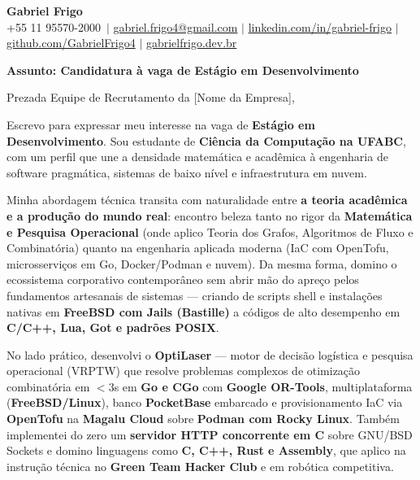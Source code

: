 \documentclass[letterpaper,10pt]{article}
\makeatletter
\newcommand{\candidateName}{Gabriel Frigo}
\newcommand{\candidatePhone}{+55 11 95570-2000}
\newcommand{\candidateEmail}{gabriel.frigo4@gmail.com}
\newcommand{\candidateLinkedInUser}{gabriel-frigo}
\newcommand{\candidateLinkedInURL}{https://linkedin.com/in/gabriel-frigo-b6727b275/}
\newcommand{\candidateGitHubUser}{GabrielFrigo4}
\newcommand{\candidateGitHubURL}{https://github.com/GabrielFrigo4}
\newcommand{\candidateWebsite}{gabrielfrigo.dev.br}
\newcommand{\candidateWebsiteURL}{https://gabrielfrigo.dev.br}
\newcommand{\targetRole}{Estágio em Desenvolvimento}
\newcommand{\targetCompany}{[Nome da Empresa]}
\makeatother
\begin{document}
\begin{center}
  \textbf{\Huge \candidateName} \\ \vspace{4pt}
  \small \candidatePhone\ $|$ \href{mailto:\candidateEmail}{\candidateEmail} $|$
  \href{\candidateLinkedInURL}{linkedin.com/in/\candidateLinkedInUser} $|$
  \href{\candidateGitHubURL}{github.com/\candidateGitHubUser} $|$
  \href{\candidateWebsiteURL}{\candidateWebsite}
\end{center}

\vspace{6pt}

\textbf{Assunto: Candidatura à vaga de \targetRole}

Prezada Equipe de Recrutamento da \targetCompany,

Escrevo para expressar meu interesse na vaga de \textbf{\targetRole}. Sou estudante de \textbf{Ciência da Computação na UFABC}, com um perfil que une a densidade matemática e acadêmica à engenharia de software pragmática, sistemas de baixo nível e infraestrutura em nuvem.

Minha abordagem técnica transita com naturalidade entre \textbf{a teoria acadêmica e a produção do mundo real}: encontro beleza tanto no rigor da \textbf{Matemática e Pesquisa Operacional} (onde aplico Teoria dos Grafos, Algoritmos de Fluxo e Combinatória) quanto na engenharia aplicada moderna (IaC com OpenTofu, microsserviços em Go, Docker/Podman e nuvem). Da mesma forma, domino o ecossistema corporativo contemporâneo sem abrir mão do apreço pelos fundamentos artesanais de sistemas — criando de scripts shell e instalações nativas em \textbf{FreeBSD com Jails (Bastille)} a códigos de alto desempenho em \textbf{C/C++, Lua, Got e padrões POSIX}.

No lado prático, desenvolvi o \textbf{OptiLaser} — motor de decisão logística e pesquisa operacional (VRPTW) que resolve problemas complexos de otimização combinatória em $<3$s em \textbf{Go e CGo} com \textbf{Google OR-Tools}, multiplataforma (\textbf{FreeBSD/Linux}), banco \textbf{PocketBase} embarcado e provisionamento IaC via \textbf{OpenTofu} na \textbf{Magalu Cloud} sobre \textbf{Podman com Rocky Linux}. Também implementei do zero um \textbf{servidor HTTP concorrente em C} sobre GNU/BSD Sockets e domino linguagens como \textbf{C, C++, Rust e Assembly}, que aplico na instrução técnica no \textbf{Green Team Hacker Club} e em robótica competitiva.
\end{document}
